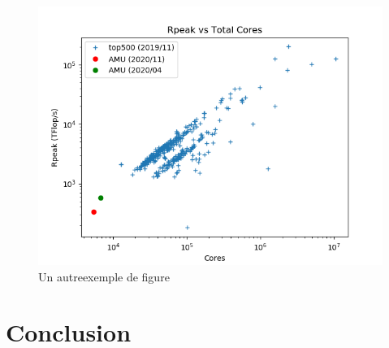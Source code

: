 \documentclass[11pt,a4paper]{article}
\begin{document}
\lipsum[8]

\begin{figure}[tbh]
\centering
\includegraphics[width=.5\textwidth]{rpeak}
\caption{\label{fig:repeak} Un autreexemple de figure}
\end{figure}

\lipsum[9]

\section{Conclusion}
\lipsum[10]




\end{document}
